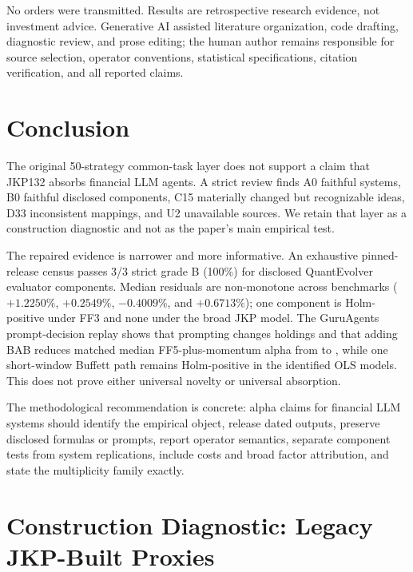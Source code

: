 \documentclass[sigconf,anonymous]{acmart}
\begin{document}
No orders were transmitted. Results are retrospective research evidence, not investment advice. Generative AI assisted literature organization, code drafting, diagnostic review, and prose editing; the human author remains responsible for source selection, operator conventions, statistical specifications, citation verification, and all reported claims.

\section{Conclusion}

The original 50-strategy common-task layer does not support a claim that JKP132 absorbs financial LLM agents. A strict review finds A0 faithful systems, B0 faithful disclosed components, C15 materially changed but recognizable ideas, D33 inconsistent mappings, and U2 unavailable sources. We retain that layer as a construction diagnostic and not as the paper's main empirical test.

The repaired evidence is narrower and more informative. An exhaustive pinned-release census passes 3/3 strict grade B (100\%) for disclosed QuantEvolver evaluator components. Median residuals are non-monotone across benchmarks ($+1.2250\%$, $+0.2549\%$, $-0.4009\%$, and $+0.6713\%$); one component is Holm-positive under FF3 and none under the broad JKP model. The GuruAgents prompt-decision replay shows that prompting changes holdings and that adding BAB reduces matched median FF5-plus-momentum alpha from \PromptReplayFFFiveMomMedianAlphaPct to \PromptReplayBABMedianAlphaPct, while one short-window Buffett path remains Holm-positive in the identified OLS models. This does not prove either universal novelty or universal absorption.

The methodological recommendation is concrete: alpha claims for financial LLM systems should identify the empirical object, release dated outputs, preserve disclosed formulas or prompts, report operator semantics, separate component tests from system replications, include costs and broad factor attribution, and state the multiplicity family exactly.

\section{Construction Diagnostic: Legacy JKP-Built Proxies}
\label{sec:proxy-diagnostic}
\end{document}
